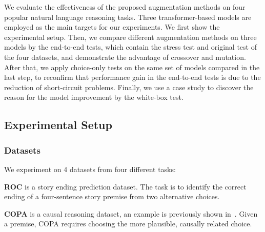 
We evaluate the effectiveness of the proposed augmentation methods on four popular 
natural language reasoning tasks.
Three transformer-based models are employed as the
main targets for our experiments. 
We first show the experimental setup. 
Then, we compare different augmentation methods on three models by the 
end-to-end tests, which contain
the stress test and original test of the four datasets, and demonstrate
the advantage of crossover and mutation. 
After that, we apply choice-only tests on the same set of models compared in the
last step, to reconfirm that performance gain in the end-to-end tests is
due to the reduction of short-circuit problems.
Finally, we use a case study to discover the reason for the model improvement 
by the white-box test. 

\subsection{Experimental Setup} 
\label{sec:setup}
\subsubsection{Datasets}
We experiment on 4 datasets from four different tasks:

\textbf{ROC} is a story ending prediction dataset. 
The task is to identify the correct ending of a four-sentence 
story premise from two alternative choices. 

\textbf{COPA} is a causal reasoning dataset, an example is previously shown
in~. Given a premise, 
COPA requires choosing the more plausible, causally related choice. 

